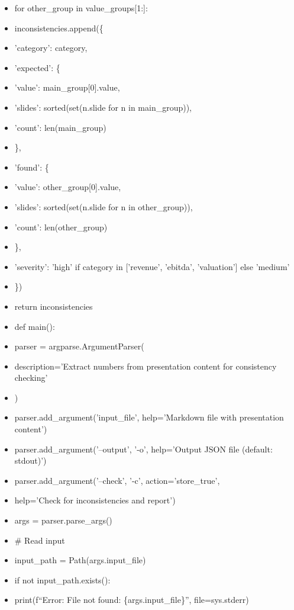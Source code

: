 \documentclass[11pt]{article}
\begin{document}
\begin{itemize}[leftmargin=*,itemsep=2pt,topsep=2pt]
\item {} for other\_\allowbreak{}group in value\_\allowbreak{}groups[1:]:
\item {} inconsistencies.append(\{
\item {} 'category': category,
\item {} 'expected': \{
\item {} 'value': main\_\allowbreak{}group[0].value,
\item {} 'slides': sorted(set(n.slide for n in main\_\allowbreak{}group)),
\item {} 'count': len(main\_\allowbreak{}group)
\item {} \},
\item {} 'found': \{
\item {} 'value': other\_\allowbreak{}group[0].value,
\item {} 'slides': sorted(set(n.slide for n in other\_\allowbreak{}group)),
\item {} 'count': len(other\_\allowbreak{}group)
\item {} \},
\item {} 'severity': 'high' if category in ['revenue', 'ebitda', 'valuation'] else 'medium'
\item {} \})
\item {} return inconsistencies
\item {} def main():
\item {} parser = argparse.ArgumentParser(
\item {} description='Extract numbers from presentation content for consistency checking'
\item {} )
\item {} parser.add\_\allowbreak{}argument('input\_\allowbreak{}file', help='Markdown file with presentation content')
\item {} parser.add\_\allowbreak{}argument('--output', '-o', help='Output JSON file (default: stdout)')
\item {} parser.add\_\allowbreak{}argument('--check', '-c', action='store\_\allowbreak{}true',
\item {} help='Check for inconsistencies and report')
\item {} args = parser.parse\_\allowbreak{}args()
\item {} \# Read input
\item {} input\_\allowbreak{}path = Path(args.input\_\allowbreak{}file)
\item {} if not input\_\allowbreak{}path.exists():
\item {} print(f``Error: File not found: \{args.input\_\allowbreak{}file\}'', file=sys.stderr)

\end{itemize}
\end{document}
